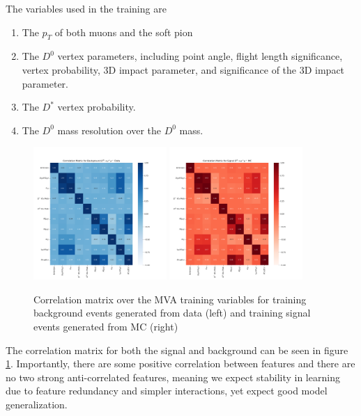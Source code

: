 The variables used in the training are
\begin{enumerate}
    \item The $p_T$ of both muons and the soft pion
    \item The $D^0$ vertex parameters, including point angle, flight length significance, vertex probability, 3D impact parameter, and significance of the 3D impact parameter.
    \item The $D^*$ vertex probability.
    \item The $D^0$ mass resolution over the $D^0$ mass.
\end{enumerate}

\begin{figure}[htp]
    \begin{center}
      \includegraphics[width=0.45\textwidth]{figures/chapter4/mva/Correlation_data.png}
      \includegraphics[width=0.45\textwidth]{figures/chapter4/mva/Correlation_dmm.png}\\
    \end{center}
    \caption{
      Correlation matrix over the MVA training variables for training background events generated from data (left) and training signal events generated from MC (right)
    }
    \label{fig:mva_correlation_matrix_for_training_variables}
\end{figure}

The correlation matrix for both the signal and background can be seen in figure \ref{fig:mva_correlation_matrix_for_training_variables}. Importantly, there are some positive correlation between features and there are no two strong anti-correlated features, meaning we expect stability in learning due to feature redundancy and simpler interactions, yet expect good model generalization. 

